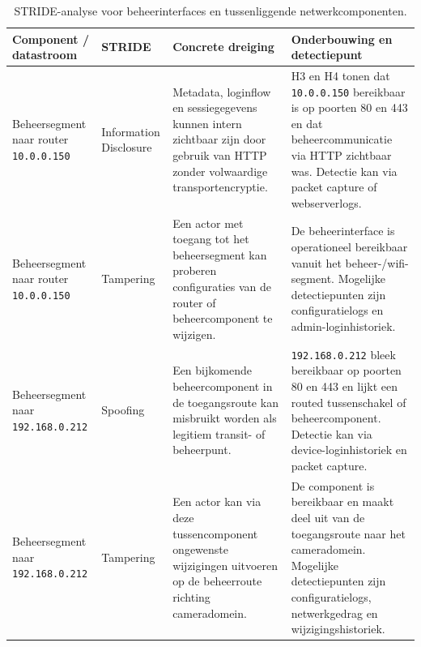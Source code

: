 \begin{table}[H]
    \centering
    \scriptsize
    \caption[STRIDE-analyse voor beheerinterfaces en tussencomponenten]{STRIDE-analyse voor beheerinterfaces en tussenliggende netwerkcomponenten.}
    \label{tab:app-stride-beheerinterfaces}
    \begin{tabularx}{\textwidth}{p{}p{}X X}
        \hline
        \textbf{Component / datastroom} & \textbf{STRIDE} & \textbf{Concrete dreiging} & \textbf{Onderbouwing en detectiepunt} \\
        \hline
        Beheersegment naar router \texttt{10.0.0.150} &
        Information Disclosure &
        Metadata, loginflow en sessiegegevens kunnen intern zichtbaar zijn door gebruik van HTTP zonder volwaardige transportencryptie. &
        H3 en H4 tonen dat \texttt{10.0.0.150} bereikbaar is op poorten 80 en 443 en dat beheercommunicatie via HTTP zichtbaar was. Detectie kan via packet capture of webserverlogs. \\
        \hline
        Beheersegment naar router \texttt{10.0.0.150} &
        Tampering &
        Een actor met toegang tot het beheersegment kan proberen configuraties van de router of beheercomponent te wijzigen. &
        De beheerinterface is operationeel bereikbaar vanuit het beheer-/wifi-segment. Mogelijke detectiepunten zijn configuratielogs en admin-loginhistoriek. \\
        \hline
        Beheersegment naar \texttt{192.168.0.212} &
        Spoofing &
        Een bijkomende beheercomponent in de toegangsroute kan misbruikt worden als legitiem transit- of beheerpunt. &
        \texttt{192.168.0.212} bleek bereikbaar op poorten 80 en 443 en lijkt een routed tussenschakel of beheercomponent. Detectie kan via device-loginhistoriek en packet capture. \\
        \hline
        Beheersegment naar \texttt{192.168.0.212} &
        Tampering &
        Een actor kan via deze tussencomponent ongewenste wijzigingen uitvoeren op de beheerroute richting cameradomein. &
        De component is bereikbaar en maakt deel uit van de toegangsroute naar het cameradomein. Mogelijke detectiepunten zijn configuratielogs, netwerkgedrag en wijzigingshistoriek. \\
        \hline
    \end{tabularx}
\end{table}

\subsection{}%
\label{app:stride-nvr-segmentatie}

